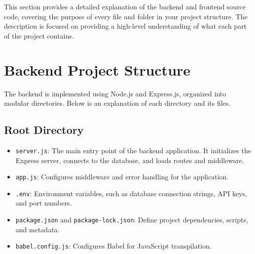 This section provides a detailed explanation of the backend and frontend source code, covering the purpose of every file and folder in your project structure. The description is focused on providing a high-level understanding of what each part of the project contains.

\section{Backend Project Structure}
The backend is implemented using Node.js and Express.js, organized into modular directories. Below is an explanation of each directory and its files.

\subsection{Root Directory}
\begin{itemize}
    \item \texttt{server.js}: The main entry point of the backend application. It initializes the Express server, connects to the database, and loads routes and middleware.
    \item \texttt{app.js}: Configures middleware and error handling for the application.
    \item \texttt{.env}: Environment variables, such as database connection strings, API keys, and port numbers.
    \item \texttt{package.json} and \texttt{package-lock.json}: Define project dependencies, scripts, and metadata.
    \item \texttt{babel.config.js}: Configures Babel for JavaScript transpilation.
\end{itemize}

